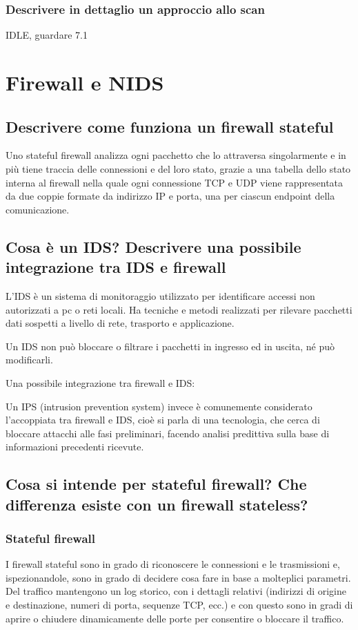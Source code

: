 \documentclass{report}
\begin{document}
\subsection{Descrivere in dettaglio un approccio allo scan}
IDLE, guardare 7.1




\chapter{Firewall e NIDS}
\section{Descrivere come funziona un firewall stateful}
Uno stateful firewall analizza ogni pacchetto che lo attraversa singolarmente e in più tiene traccia delle connessioni e del loro stato, grazie 
a una tabella dello stato interna al firewall nella quale ogni connessione TCP e UDP viene rappresentata da due coppie formate da indirizzo IP e porta, 
una per ciascun endpoint della comunicazione.

\section{Cosa è un IDS? Descrivere una possibile integrazione tra IDS e firewall}
L'IDS è un sistema di monitoraggio utilizzato per identificare accessi non autorizzati a pc o reti locali. Ha tecniche e metodi realizzati per rilevare pacchetti 
dati sospetti a livello di rete, trasporto e applicazione. 

\noindent Un IDS non può bloccare o filtrare i pacchetti in ingresso ed in uscita, né può modificarli.

\noindent Una possibile integrazione tra firewall e IDS:

\noindent Un IPS (intrusion prevention system) invece è comunemente considerato l’accoppiata tra firewall e IDS, cioè si parla di una tecnologia, che cerca di bloccare attacchi alle fasi 
preliminari, facendo analisi predittiva sulla base di informazioni precedenti ricevute.

\section{Cosa si intende per stateful firewall? Che differenza esiste con un firewall stateless?}
\subsection{Stateful firewall}
I firewall stateful sono in grado di riconoscere le connessioni e le trasmissioni e, ispezionandole, sono in grado di decidere cosa fare in base a molteplici parametri.
\noindent Del traffico mantengono un log storico, con i dettagli relativi (indirizzi di origine e destinazione, numeri di porta, sequenze TCP, ecc.) e con questo sono in gradi di 
aprire o chiudere dinamicamente delle porte per consentire o bloccare il traffico.
\end{document}
